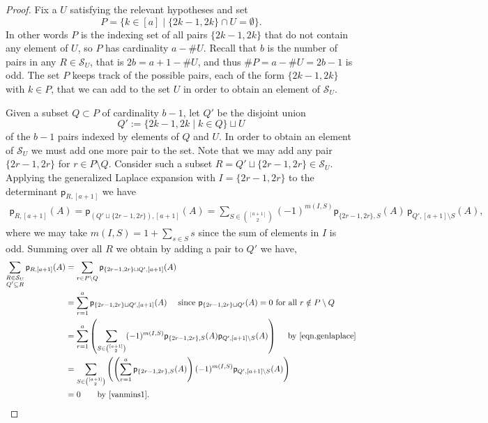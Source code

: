 \documentclass[11pt]{amsart}
\theoremstyle{remark}
\theoremstyle{remark}
\theoremstyle{definition}
\theoremstyle{definition}
\theoremstyle{definition}
\numberwithin{equation}{section}
\newcommand{\cs}{\mathcal{S}}
\newcommand{\pl}{\mathsf{p}}
\begin{document}
\begin{proof}
Fix a $U$ satisfying the relevant hypotheses and set
\[
P=\{k\in[a] \mid  \{2k-1, 2k\}\cap U = \emptyset\}.
\]
In other words $P$ is the indexing set of all pairs $\{2k-1, 2k\}$ that do not contain any element of $U$, so $P$ has cardinality $a-\#U$. Recall that $b$ is the number of pairs in any $R\in \cs_U$, that is $2b = a+1-\#U$, and thus $\# P =a-\#U = 2b-1$ is odd. 
The set $P$ keeps track of the possible pairs, each of the form $\{2k-1,2k\}$ with $k\in P$, that we can add to the set $U$ in order to obtain an element of $\cs_U$.

 
Given a subset $Q\subset P$ of cardinality $b-1$, let $Q'$ be the disjoint union 
\[
Q':=\{2k-1,2k \mid  k\in Q\} \sqcup U
\]
of the $b-1$ pairs indexed by elements of $Q$ and $U$. In order to obtain an element of $\cs_U$ we must add one more pair to the set. Note that we may add any pair $\{2r-1, 2r\}$ for $r\in P\setminus Q$. Consider such a subset $R=Q'\sqcup \{2r-1,2r\}\in \cs_U$. Applying the generalized Laplace expansion with $I= \{2r-1,2r\}$ to the determinant $\pl_{R, [a+1]}$ we have 
\begin{align}\label{eqn.genlaplace}
\pl_{R, [a+1]} (A) 
= \pl_{\left( Q'\sqcup\{2r-1, 2r\}\right), [a+1]}(A) 
= \sum_{S\in \binom{[a+1]}{2}} (-1)^{m(I,S)} \pl_{\{2r-1,2r\}, S}(A) \, \pl_{Q',[a+1]\setminus S}(A),
\end{align}
where we may take $m(I,S) = 1+\sum_{s\in S}s$ since the sum of elements in $I$ is odd. 
Summing over all $R$ we obtain by adding a pair to $Q'$ we have,
\begin{align*}
\sum_{\substack{R\in \cs_U\\ Q'\subseteq R}} \pl_{R,[a+1]}(A) &=  
\sum_{r\in P\setminus Q} \pl_{\{2r-1,2r\}\sqcup Q' , [a+1]}(A) \\ 
&= \sum_{r=1}^a \pl_{\{2r-1,2r\}\sqcup Q' , [a+1]}(A) \quad \text { since $\pl_{\{2r-1, 2r\} \sqcup Q'}(A)=0$ for all $r\notin P\setminus Q$ }\\
&= \sum_{r=1}^a \left( \sum_{S\in \binom{[a+1]}{2}} (-1)^{m(I,S)} \pl_{\{2r-1, 2r\},S}(A) \pl_{Q', [a+1]\setminus S}(A) \right) \quad \text{ by~\eqref{eqn.genlaplace}} \\
&= \sum_{S\in \binom{[a+1]}{2}} \left(  \left( \sum_{r=1}^a \pl_{\{2r-1, 2r\},S}(A) \right) (-1)^{m(I,S)}  \pl_{Q', [a+1]\setminus S}(A)\right)\\
&= 0 \quad\quad \text{by \eqref{vanmins1}.}
\end{align*}



\end{proof}
\end{document}
